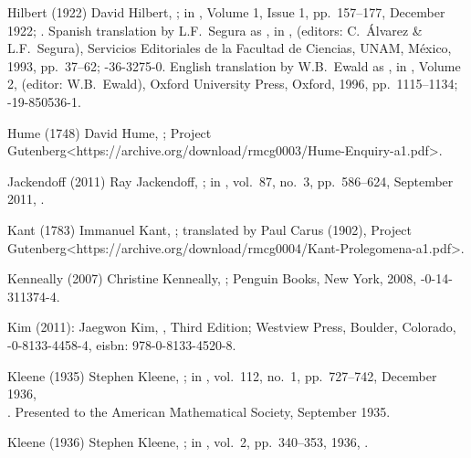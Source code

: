 \biblabel Hilbert (1922)
David Hilbert,
;
in ,
Volume 1, Issue 1, pp.~157--177, December 1922;
.
Spanish translation by L.F.\ Segura as
,
in ,
 (editors: C.\ Álvarez \& L.F.\ Segura),
Servicios Editoriales de la Facultad de Ciencias, UNAM,
México, 1993, pp.~37--62;
-36-3275-0.
English translation by W.B.\ Ewald as
,
in , Volume 2,
 (editor: W.B.\ Ewald),
Oxford University Press, Oxford, 1996, pp.~1115--1134;
-19-850536-1.

\biblabel Hume (1748)
David Hume,
;
\URL Project Gutenberg<https://archive.org/download/rmcg0003/Hume-Enquiry-a1.pdf>.

\biblabel Jackendoff (2011)
Ray Jackendoff,
;
in ,
vol.\ 87, no.\ 3, pp.\ 586--624, September 2011,
.

\biblabel Kant (1783)
Immanuel Kant,
;
translated by Paul Carus (1902),
\URL Project Gutenberg<https://archive.org/download/rmcg0004/Kant-Prolegomena-a1.pdf>.

\biblabel Kenneally (2007)
Christine Kenneally,
;
Penguin Books, New York, 2008,
-0-14-311374-4.

\biblabel Kim (2011):
Jaegwon Kim,
, Third Edition;
Westview Press, Boulder, Colorado,
-0-8133-4458-4,
e{\sc isbn}: 978-0-8133-4520-8.

\biblabel Kleene (1935)
Stephen Kleene,
;
in ,
vol.\ 112, no.\ 1, pp.\ 727--742, December 1936,\\
.
Presented to the American Mathematical Society,
September 1935.

\biblabel Kleene (1936)
Stephen Kleene,
;
in ,
vol.\ 2, pp.\ 340--353, 1936,
.

